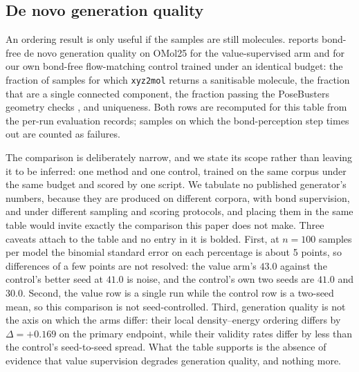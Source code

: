 \subsection{De novo generation quality}
\label{app:generation}

An ordering result is only useful if the samples are still molecules.
 reports bond-free de novo generation quality on OMol25 for the
value-supervised arm and for our own bond-free flow-matching control trained under an
identical budget: the fraction of samples for which \texttt{xyz2mol} returns a
sanitisable molecule, the fraction that are a single connected component, the fraction
passing the PoseBusters geometry checks \citep{posebusters}, and uniqueness. Both rows
are recomputed for this table from the per-run evaluation records; samples on which the
bond-perception step times out are counted as failures.

The comparison is deliberately narrow, and we state its scope rather than leaving it to
be inferred: one method and one control, trained on the same corpus under the same
budget and scored by one script. We tabulate no published generator's numbers, because
they are produced on different corpora, with bond supervision, and under different
sampling and scoring protocols, and placing them in the same table would invite exactly
the comparison this paper does not make. Three caveats attach to the table and no entry
in it is bolded. First, at $n = 100$ samples per model the binomial standard error on
each percentage is about 5 points, so differences of a few points are not resolved:
the value arm's $43.0$ against the control's better seed at $41.0$ is noise, and the
control's own two seeds are $41.0$ and $30.0$. Second, the value row is a single run
while the control row is a two-seed mean, so this comparison is not seed-controlled.
Third, generation quality is not the axis on which the arms differ: their local
density--energy ordering differs by $\Delta = +0.169$ on the primary endpoint, while
their validity rates differ by less than the control's seed-to-seed spread. What the
table supports is the absence of evidence that value supervision degrades generation
quality, and nothing more.

